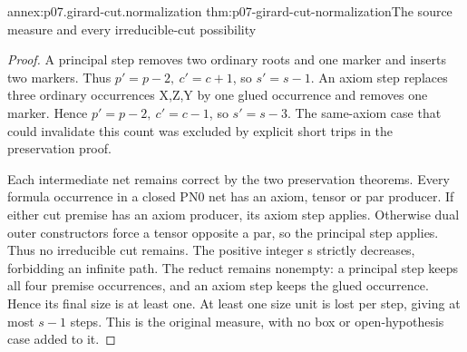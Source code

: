 \begin{annexitem}{annex:p07.girard-cut.normalization}
 {thm:p07-girard-cut-normalization}{The source measure and every irreducible-cut possibility}
\begin{proof}
A principal step removes two ordinary roots and one marker and inserts
two markers. Thus \(p'=p-2,\ c'=c+1\), so \(s'=s-1\).
An axiom step replaces three ordinary occurrences X,Z,Y by one glued
occurrence and removes one marker. Hence \(p'=p-2,\ c'=c-1\),
so \(s'=s-3\). The same-axiom case that could invalidate this
count was excluded by explicit short trips in the preservation proof.

Each intermediate net remains correct by the two preservation theorems.
Every formula occurrence in a closed PN0 net has an axiom, tensor or
par producer. If either cut premise has an axiom producer, its axiom
step applies. Otherwise dual outer constructors force a tensor opposite
a par, so the principal step applies. Thus no irreducible cut remains.
The positive integer s strictly decreases, forbidding an infinite path.
The reduct remains nonempty: a principal step keeps all four premise
occurrences, and an axiom step keeps the glued occurrence.
Hence its final size is at least one. At least one size unit is lost
per step, giving at most \(s-1\) steps. This is the original measure,
with no box or open-hypothesis case added to it.
\end{proof}
\end{annexitem}

